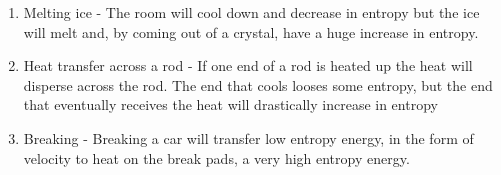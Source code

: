 \documentclass[12pt]{article}
\makeatletter
\theoremstyle{homework}
\newenvironment{exercise}[1]
{\def\@currentlabel{#1}\exercisecore}
{\endexercisecore}
\makeatother
\begin{document}
\begin{exercise}{2.41}
\begin{enumerate}
\item
Melting ice - The room will cool down and decrease in entropy but the ice will melt and, by coming out of a crystal, have a huge increase in entropy.
\item
Heat transfer across a rod - If one end of a rod is heated up the heat will disperse across the rod.  The end that cools looses some entropy, but the end that eventually receives the heat will drastically increase in entropy
\item
Breaking - Breaking a car will transfer low entropy energy, in the form of velocity to heat on the break pads, a very high entropy energy.
\end{enumerate}
\end{exercise}
\end{document}

